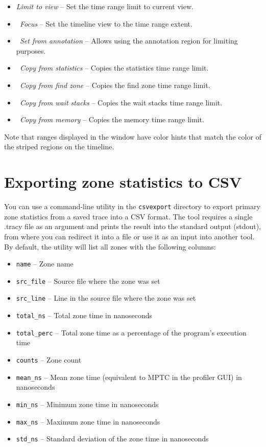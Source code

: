\documentclass[hidelinks,titlepage,a4paper,twoside]{article}
\begin{document}
\begin{itemize}
\item \emph{Limit to view} -- Set the time range limit to current view.
\item \emph{\faMicroscope{}~Focus} -- Set the timeline view to the time range extent.
\item \emph{\faStickyNote{}~Set from annotation} -- Allows using the annotation region for limiting purposes.
\item \emph{\faSortAmountUp{}~Copy from statistics} -- Copies the statistics time range limit.
\item \emph{\faSearch{}~Copy from find zone} -- Copies the find zone time range limit.
\item \emph{\faHourglassHalf{}~Copy from wait stacks} -- Copies the wait stacks time range limit.
\item \emph{\faMemory{}~Copy from memory} -- Copies the memory time range limit.
\end{itemize}

Note that ranges displayed in the window have color hints that match the color of the striped regions on the timeline.

\section{Exporting zone statistics to CSV}
\label{csvexport}

You can use a command-line utility in the \texttt{csvexport} directory to export primary zone statistics from a saved trace into a CSV format.
The tool requires a single .tracy file as an argument and prints the result into the standard output (stdout), from where you can redirect it into a file or use it as an input into another tool.
By default, the utility will list all zones with the following columns:

\begin{itemize}
  \item \texttt{name} -- Zone name
  \item \texttt{src\_file} -- Source file where the zone was set
  \item \texttt{src\_line} -- Line in the source file where the zone was set
  \item \texttt{total\_ns} -- Total zone time in nanoseconds
  \item \texttt{total\_perc} -- Total zone time as a percentage of the program's execution time
  \item \texttt{counts} -- Zone count
  \item \texttt{mean\_ns} -- Mean zone time (equivalent to MPTC in the profiler GUI) in nanoseconds
  \item \texttt{min\_ns} -- Minimum zone time in nanoseconds
  \item \texttt{max\_ns} -- Maximum zone time in nanoseconds
  \item \texttt{std\_ns} -- Standard deviation of the zone time in nanoseconds
\end{itemize}
\end{document}

